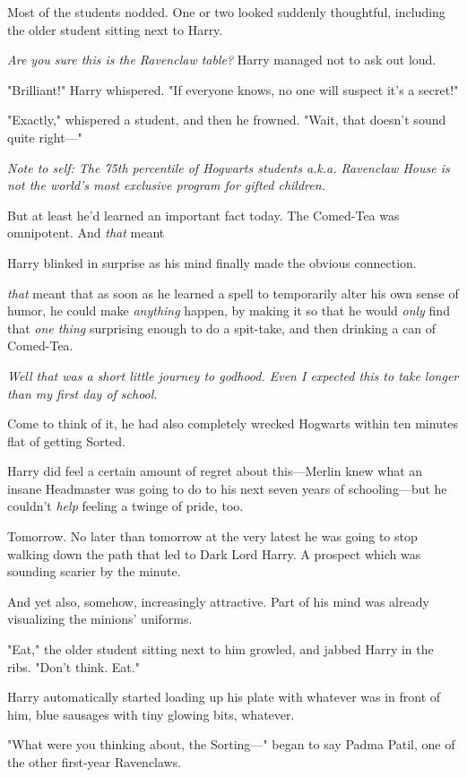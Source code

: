 Most of the students nodded. One or two looked suddenly thoughtful, including
the older student sitting next to Harry.

\emph{Are you sure this is the Ravenclaw table?} Harry managed not to ask out
loud.

"Brilliant!" Harry whispered. "If everyone knows, no one will suspect it's a
secret!"

"Exactly," whispered a student, and then he frowned. "Wait, that doesn't sound
quite right\mbox{---}"

\emph{Note to self: The 75th percentile of Hogwarts students a.k.a. Ravenclaw
House is not the world's most exclusive program for gifted children.}

But at least he'd learned an important fact today. The Comed-Tea was
omnipotent. And \emph{that} meant{\el}

Harry blinked in surprise as his mind finally made the obvious connection.

{\el} \emph{that} meant that as soon as he learned a spell to temporarily
alter his own sense of humor, he could make \emph{anything} happen, by making
it so that he would \emph{only} find that \emph{one thing} surprising enough to
do a spit-take, and then drinking a can of Comed-Tea.

\emph{Well that was a short little journey to godhood. Even I expected this to
take longer than my first day of school.}

Come to think of it, he had also completely wrecked Hogwarts within ten minutes
flat of getting Sorted.

Harry did feel a certain amount of regret about this---Merlin knew what an
insane Headmaster was going to do to his next seven years of schooling---but he
couldn't \emph{help} feeling a twinge of pride, too.

Tomorrow. No later than tomorrow at the very latest he was going to stop
walking down the path that led to Dark Lord Harry. A prospect which was
sounding scarier by the minute.

And yet also, somehow, increasingly attractive. Part of his mind was already
visualizing the minions' uniforms.

"Eat," the older student sitting next to him growled, and jabbed Harry in the
ribs. "Don't think. Eat."

Harry automatically started loading up his plate with whatever was in front of
him, blue sausages with tiny glowing bits, whatever.

"What were you thinking about, the Sorting\mbox{---}" began to say Padma Patil, one of
the other first-year Ravenclaws.

